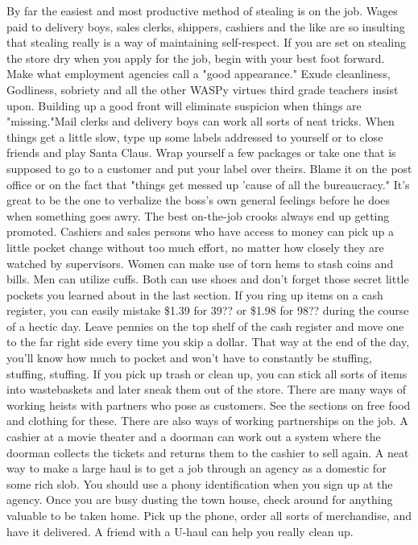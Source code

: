 \documentclass[11pt,twoside,a4paper]{book}
\begin{document}
By far the easiest and most productive method of stealing is on the job. Wages paid to delivery boys, sales clerks, shippers, cashiers and the like are so insulting that stealing really is a way of maintaining self-respect. If you are set on stealing the store dry when you apply for the job, begin with your best foot forward. Make what employment agencies call a "good appearance." Exude cleanliness, Godliness, sobriety and all the other WASPy virtues third grade teachers insist upon. Building up a good front will eliminate suspicion when things are "missing."Mail clerks and delivery boys can work all sorts of neat tricks. When things get a little slow, type up some labels addressed to yourself or to close friends and play Santa Claus. Wrap yourself a few packages or take one that is supposed to go to a customer and put your label over theirs. Blame it on the post office or on the fact that "things get messed up 'cause of all the bureaucracy." It's great to be the one to verbalize the boss's own general feelings before he does when something goes awry. The best on-the-job crooks always end up getting promoted. Cashiers and sales persons who have access to money can pick up a little pocket change without too much effort, no matter how closely they are watched by supervisors. Women can make use of torn hems to stash coins and bills. Men can utilize cuffs. Both can use shoes and don't forget those secret little pockets you learned about in the last section. If you ring up items on a cash register, you can easily mistake \$1.39 for 39?? or \$1.98 for 98?? during the course of a hectic day. Leave pennies on the top shelf of the cash register and move one to the far right side every time you skip a dollar. That way at the end of the day, you'll know how much to pocket and won't have to constantly be stuffing, stuffing, stuffing. If you pick up trash or clean up, you can stick all sorts of items into wastebaskets and later sneak them out of the store. There are many ways of working heists with partners who pose as customers. See the sections on free food and clothing for these. There are also ways of working partnerships on the job. A cashier at a movie theater and a doorman can work out a system where the doorman collects the tickets and returns them to the cashier to sell again. A neat way to make a large haul is to get a job through an agency as a domestic for some rich slob. You should use a phony identification when you sign up at the agency. Once you are busy dusting the town house, check around for anything valuable to be taken home. Pick up the phone, order all sorts of merchandise, and have it delivered. A friend with a U-haul can help you really clean up.~\\
\end{document}
